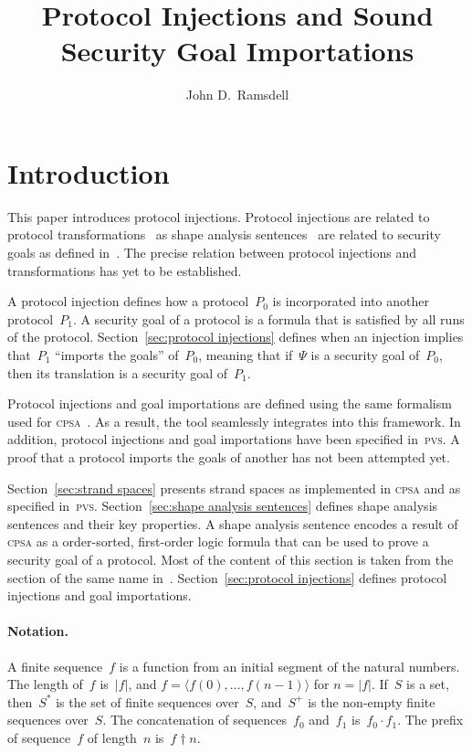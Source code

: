 \documentclass[12pt]{article}
\title{Protocol Injections and Sound\\ Security Goal Importations}
\author{John D.\ Ramsdell}
\newcommand{\cpsa}{\textsc{cpsa}}
\newcommand{\pvs}{\textsc{pvs}}
\newcommand{\seq}[1]{\ensuremath{\langle#1\rangle}}
\newcommand{\prefix}[2]{#1\dagger#2}
\newcommand{\append}{\cdot}
\begin{document}
\maketitle

\section{Introduction}

This paper introduces protocol injections.  Protocol injections are
related to protocol transformations~\cite{Guttman12a} as shape
analysis sentences~\cite{Ramsdell12} are related to security goals as
defined in~\cite{Guttman12a}.  The precise relation between protocol
injections and transformations has yet to be established.

A protocol injection defines how a protocol~$P_0$ is incorporated into
another protocol~$P_1$.  A security goal of a protocol is a formula
that is satisfied by all runs of the protocol.
Section~\ref{sec:protocol injections} defines when an injection
implies that~$P_1$ ``imports the goals'' of~$P_0$, meaning that if~$\Psi$
is a security goal of~$P_0$, then its translation is a security goal
of~$P_1$.

Protocol injections and goal importations are defined using the same
formalism used for {\cpsa}~\cite{cpsaspec09}.  As a result, the tool
seamlessly integrates into this framework.  In addition, protocol
injections and goal importations have been specified in~{\pvs}.  A
proof that a protocol imports the goals of another has not been
attempted yet.

Section~\ref{sec:strand spaces} presents strand spaces as implemented
in {\cpsa} and as specified in~{\pvs}.  Section~\ref{sec:shape
  analysis sentences} defines shape analysis sentences and their key
properties.  A shape analysis sentence encodes a result of {\cpsa}
as a order-sorted, first-order logic formula that can be used to
prove a security goal of a protocol.  Most of the content of this
section is taken from the section of the same name
in~\cite{Ramsdell12}.  Section~\ref{sec:protocol injections} defines
protocol injections and goal importations.

\paragraph{Notation.}

A finite sequence~$f$ is a function from an initial segment of the
natural numbers.  The length of~$f$ is~$|f|$, and $f=\seq{f(0),\ldots,
  f(n-1)}$ for $n=|f|$.  If~$S$ is a set, then~$S^\ast$ is the set of
finite sequences over~$S$, and~$S^+$ is the non-empty finite sequences
over~$S$.  The concatenation of sequences~$f_0$ and~$f_1$
is~$f_0\append f_1$.  The prefix of sequence~$f$ of length~$n$
is~$\prefix{f}{n}$.
\end{document}
